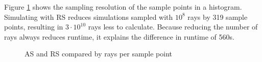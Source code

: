 Figure \ref{plot:repetitive} shows the sampling resolution
of the sample points in a histogram. Simulating with RS reduces
simulations sampled with $10^8$ rays by 319 sample points, resulting in 
$3\cdot10^{10}$ rays less to calculate. Because reducing the number of rays always
reduces runtime, it explains the difference in runtime
of 560s.
\begin{figure}[H]
  \centerline{
    }
  \caption{AS and RS compared by rays per sample point}
  \label{plot:repetitive}
\end{figure}

